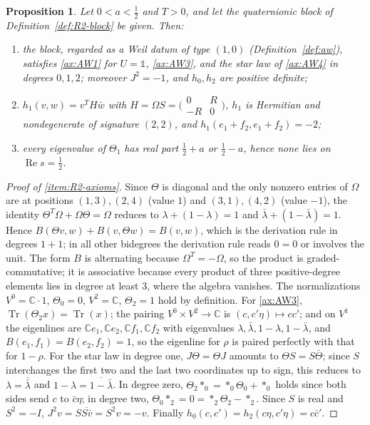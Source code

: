 \documentclass[11pt]{amsart}
\theoremstyle{plain}
\newtheorem{proposition}[theorem]{Proposition}
\theoremstyle{definition}
\theoremstyle{remark}
\numberwithin{equation}{section}
\newcommand{\C}{\mathbb{C}}
\DeclareMathOperator{\Tr}{Tr}
\DeclareMathOperator{\Rea}{Re}
\renewcommand{\Re}{\Rea}
\begin{document}
\begin{proposition}\label{prop:R2}
Let $0<a<\tfrac12$ and $T>0$, and let the quaternionic block of
Definition~\ref{def:R2-block} be given. Then:
\begin{enumerate}[label=(\roman*)]
\item\label{item:R2-axioms} the block, regarded as a Weil datum of type
  $(1,0)$ (Definition~\ref{def:aw}), satisfies \ref{ax:AW1} for $U=\mathbb 1$,
  \ref{ax:AW3}, and the star law of \ref{ax:AW4} in degrees $0,1,2$;
  moreover $J^2=-1$, and $h_0,h_2$ are positive definite;
\item\label{item:R2-form} $h_1(v,w)=v^TH\bar w$ with
  $H=\Omega S=\bigl(\begin{smallmatrix}0&R\\-R&0\end{smallmatrix}\bigr)$,
  $h_1$ is Hermitian and nondegenerate of signature $(2,2)$, and
  $h_1(e_1+f_2,e_1+f_2)=-2$;
\item\label{item:R2-off} every eigenvalue of $\Theta_1$ has real part
  $\tfrac12+a$ or $\tfrac12-a$, hence none lies on $\Re s=\tfrac12$.
\end{enumerate}
\end{proposition}

\begin{proof}[Proof of \ref{item:R2-axioms}]
Since $\Theta$ is diagonal and the only nonzero entries of $\Omega$ are
at positions $(1,3),(2,4)$ (value $1$) and $(3,1),(4,2)$ (value $-1$),
the identity $\Theta^T\Omega+\Omega\Theta=\Omega$ reduces to
$\lambda+(1-\lambda)=1$ and $\bar\lambda+(1-\bar\lambda)=1$. Hence
$B(\Theta v,w)+B(v,\Theta w)=B(v,w)$, which is the derivation rule in
degrees $1+1$; in all other bidegrees the derivation rule reads $0=0$ or
involves the unit. The form $B$ is alternating because $\Omega^T=-\Omega$,
so the product is graded-commutative; it is associative because every
product of three positive-degree elements lies in degree at least $3$,
where the algebra vanishes. The normalizations $V^0=\C\cdot1$,
$\Theta_0=0$, $V^2=\C$, $\Theta_2=1$ hold by definition. For
\ref{ax:AW3}, $\Tr(\Theta_2x)=\Tr(x)$; the pairing $V^0\times V^2\to\C$
is $(c,c'\eta)\mapsto cc'$; and on $V^1$ the eigenlines are $\C e_1,\C
e_2,\C f_1,\C f_2$ with eigenvalues $\lambda,\bar\lambda,1-\lambda,
1-\bar\lambda$, and $B(e_1,f_1)=B(e_2,f_2)=1$, so the eigenline for
$\rho$ is paired perfectly with that for $1-\rho$. For the star law in
degree one, $J\Theta=\Theta J$ amounts to $\Theta S=S\bar\Theta$; since
$S$ interchanges the first two and the last two coordinates up to sign,
this reduces to $\lambda=\overline{\bar\lambda}$ and
$1-\lambda=\overline{1-\bar\lambda}$. In degree zero,
$\Theta_2*_0=*_0\Theta_0+*_0$ holds since both sides send $c$ to $\bar
c\eta$; in degree two, $\Theta_0*_2=0=*_2\Theta_2-*_2$. Since $S$ is real
and $S^2=-I$, $J^2v=S\overline{S\bar v}=S^2v=-v$. Finally
$h_0(c,c')=h_2(c\eta,c'\eta)=c\bar c'$.
\end{proof}
\end{document}
